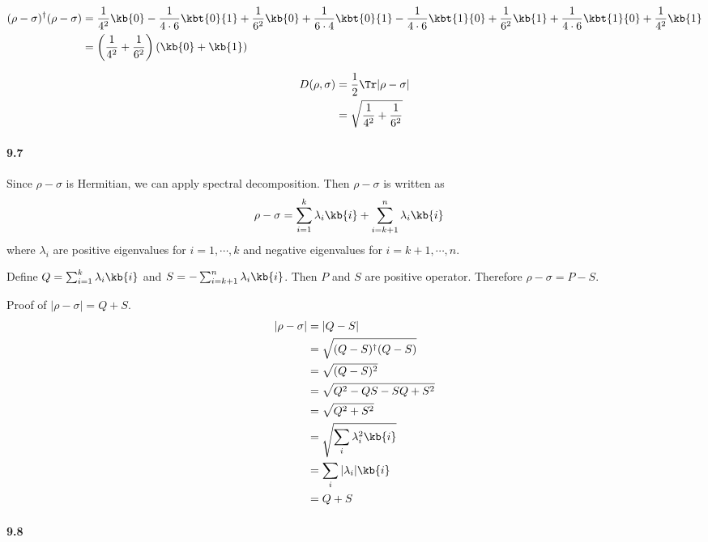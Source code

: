 \begin{align*}
	(\rho - \sigma)^\dagger (\rho - \sigma) &= \frac{1}{4^2} \kb{0} - \frac{1}{4\cdot 6} \kbt{0}{1} + \frac{1}{6^2} \kb{0} + \frac{1}{6 \cdot 4} \kbt{0}{1} - \frac{1}{4\cdot 6} \kbt{1}{0} + \frac{1}{6^2} \kb{1} + \frac{1}{4\cdot 6} \kbt{1}{0} + \frac{1}{4^2} \kb{1}\\
		&= \left(\frac{1}{4^2} + \frac{1}{6^2}\right) (\kb{0} + \kb{1})
\end{align*}


\begin{align*}
	D(\rho, \sigma) &= \frac{1}{2} \Tr |\rho - \sigma|\\
		&= \sqrt{\frac{1}{4^2} + \frac{1}{6^2}}
\end{align*}



\paragraph{9.7}

Since $\rho - \sigma$ is Hermitian, we can apply spectral decomposition.
Then $\rho - \sigma$ is written as
\begin{align*}
	\rho - \sigma &= \sum_{i=1}^k \lambda_i \kb{i} + \sum_{i=k+1}^{n} \lambda_i \kb{i}
\end{align*}
where $\lambda_i$ are  positive eigenvalues for $i = 1, \cdots, k$ and negative eigenvalues for $i = k+1, \cdots, n$.

Define $Q = \sum_{i=1}^k \lambda_i \kb{i}$ and $S = -\sum_{i=k+1}^{n} \lambda_i \kb{i}$.
Then $P$ and $S$ are positive operator. Therefore $\rho - \sigma = P - S$.

\begin{screen}
	Proof of $|\rho - \sigma| = Q + S$.
	\begin{align*}
		|\rho- \sigma| &= |Q - S|\\
			&= \sqrt{(Q-S)^\dagger (Q-S)}\\
			&= \sqrt{(Q-S)^2}\\
			&= \sqrt{Q^2 - QS - SQ + S^2}\\
			&= \sqrt{Q^2 + S^2}\\
			&= \sqrt{\sum_i \lambda_i^2 \kb{i}}\\
			&= \sum_i |\lambda_i| \kb{i}\\
			&= Q + S
	\end{align*}
\end{screen}

\paragraph{9.8}

